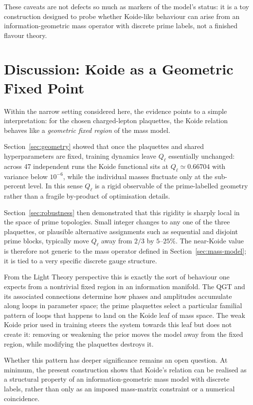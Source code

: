 \documentclass[12pt]{article}
\begin{document}
These caveats are not defects so much as markers of the model's status: it is a
toy construction designed to probe whether Koide-like behaviour can arise from an
information-geometric mass operator with discrete prime labels, not a finished
flavour theory.

\section{Discussion: Koide as a Geometric Fixed Point}
\label{sec:discussion}

Within the narrow setting considered here, the evidence points to a simple
interpretation: for the chosen charged-lepton plaquettes, the Koide relation
behaves like a \emph{geometric fixed region} of the mass model.

Section~\ref{sec:geometry} showed that once the plaquettes and shared
hyperparameters are fixed, training dynamics leave $Q_\ell$ essentially
unchanged: across 47 independent runs the Koide functional sits at
$Q_\ell \simeq 0.66704$ with variance below $10^{-6}$, while the individual
masses fluctuate only at the sub-percent level.  In this sense $Q_\ell$ is a
rigid observable of the prime-labelled geometry rather than a fragile
by-product of optimisation details.

Section~\ref{sec:robustness} then demonstrated that this rigidity is sharply
local in the space of prime topologies.  Small integer changes to any one of
the three plaquettes, or plausible alternative assignments such as sequential
and disjoint prime blocks, typically move $Q_\ell$ away from $2/3$ by
$5$–$25\%$.  The near-Koide value is therefore not generic to the mass
operator defined in Section~\ref{sec:mass-model}; it is tied to a very
specific discrete gauge structure.

From the Light Theory perspective this is exactly the sort of behaviour one
expects from a nontrivial fixed region in an information manifold.  The QGT
and its associated connections determine how phases and amplitudes accumulate
along loops in parameter space; the prime plaquettes select a particular
familial pattern of loops that happens to land on the Koide leaf of
mass space.  The weak Koide prior used in training steers the system towards
this leaf but does not create it: removing or weakening the prior moves the
model away from the fixed region, while modifying the plaquettes destroys it.

Whether this pattern has deeper significance remains an open question.
At minimum, the present construction shows that Koide's relation can be
realised as a structural property of an information-geometric mass model with
discrete labels, rather than only as an imposed mass-matrix constraint or a
numerical coincidence.
\end{document}
